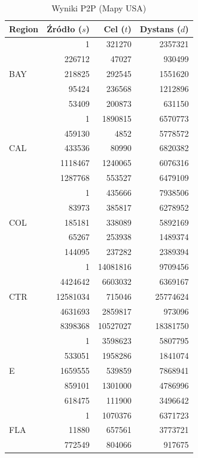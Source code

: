 \documentclass[11pt, a4paper]{article}
\begin{document}
\begin{table}[h!]
	\centering
	\caption{Wyniki P2P (Mapy USA)}
	\label{tab:usa_radix_p2p}
	\vspace{0.2cm}
	\begin{tabular}{lrrr}
		\toprule
		\textbf{Region} & \textbf{Źródło ($s$)} & \textbf{Cel ($t$)} & \textbf{Dystans ($d$)} \\
		\midrule
		\multirow{5}{*}{BAY} & 1 & 321270 & 2357321 \\
		& 226712 & 47027 & 930499 \\
		& 218825 & 292545 & 1551620 \\
		& 95424 & 236568 & 1212896 \\
		& 53409 & 200873 & 631150 \\
		\midrule
		\multirow{5}{*}{CAL} & 1 & 1890815 & 6570773 \\
		& 459130 & 4852 & 5778572 \\
		& 433536 & 80990 & 6820382 \\
		& 1118467 & 1240065 & 6076316 \\
		& 1287768 & 553527 & 6479109 \\
		\midrule
		\multirow{5}{*}{COL} & 1 & 435666 & 7938506 \\
		& 83973 & 385817 & 6278952 \\
		& 185181 & 338089 & 5892169 \\
		& 65267 & 253938 & 1489374 \\
		& 144095 & 237282 & 2389394 \\
		\midrule
		\multirow{5}{*}{CTR} & 1 & 14081816 & 9709456 \\
		& 4424642 & 6603032 & 6369167 \\
		& 12581034 & 715046 & 25774624 \\
		& 4631693 & 2859817 & 973096 \\
		& 8398368 & 10527027 & 18381750 \\
		\midrule
		\multirow{5}{*}{E} & 1 & 3598623 & 5807795 \\
		& 533051 & 1958286 & 1841074 \\
		& 1659555 & 539859 & 7868941 \\
		& 859101 & 1301000 & 4786996 \\
		& 618475 & 111900 & 3496642 \\
		\midrule
		\multirow{5}{*}{FLA} & 1 & 1070376 & 6371723 \\
		& 11880 & 657561 & 3773721 \\
		& 772549 & 804066 & 917675 \\

\end{tabular}
\end{table}
\end{document}
